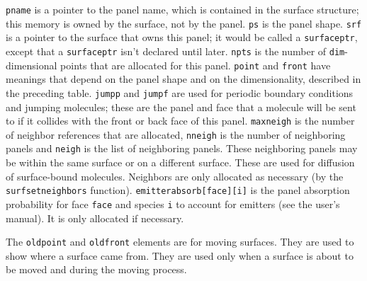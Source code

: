 \documentclass {scrbook}
\newcommand {\ttt} {\texttt}
\begin{document}
\ttt{pname} is a pointer to the panel name, which is contained in the surface structure; this memory is owned by the surface, not by the panel. \ttt{ps} is the panel shape. \ttt{srf} is a pointer to the surface that owns this panel; it would be called a \ttt{surfaceptr}, except that a \ttt{surfaceptr} isn't declared until later. \ttt{npts} is the number of \ttt{dim}-dimensional points that are allocated for this panel. \ttt{point} and \ttt{front} have meanings that depend on the panel shape and on the dimensionality, described in the preceding table. \ttt{jumpp} and \ttt{jumpf} are used for periodic boundary conditions and jumping molecules; these are the panel and face that a molecule will be sent to if it collides with the front or back face of this panel. \ttt{maxneigh} is the number of neighbor references that are allocated, \ttt{nneigh} is the number of neighboring panels and \ttt{neigh} is the list of neighboring panels. These neighboring panels may be within the same surface or on a different surface. These are used for diffusion of surface-bound molecules. Neighbors are only allocated as necessary (by the \ttt{surfsetneighbors} function). \ttt{emitterabsorb[face][i]} is the panel absorption probability for face \ttt{face} and species \ttt{i} to account for emitters (see the user's manual). It is only allocated if necessary.

The \ttt{oldpoint} and \ttt{oldfront} elements are for moving surfaces. They are used to show where a surface came from. They are used only when a surface is about to be moved and during the moving process.
\end{document}
